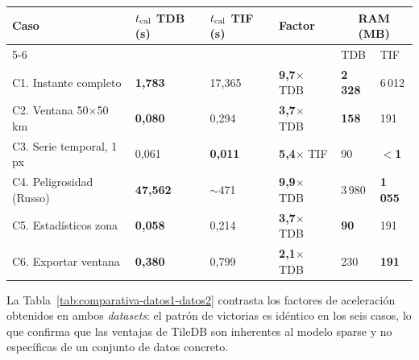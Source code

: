 \begin{center}
\begin{tabularx}{\textwidth}{p{4.5cm}XXXXX}
\toprule
\textbf{Caso}
  & \textbf{$t_{\rm cal}$ TDB (s)}
  & \textbf{$t_{\rm cal}$ TIF (s)}
  & \textbf{Factor}
  & \multicolumn{2}{c}{\textbf{RAM (MB)}} \\
\cmidrule(lr){5-6}
  & & & & TDB & TIF \\
\midrule
C1. Instante completo   & \textbf{1,783}  & 17,365         & \textbf{9,7}$\times$ TDB  & \textbf{2\,328} & 6\,012 \\
C2. Ventana 50$\times$50 km & \textbf{0,080} & 0,294       & \textbf{3,7}$\times$ TDB  & \textbf{158}    & 191 \\
C3. Serie temporal, 1 px & 0,061          & \textbf{0,011} & \textbf{5,4}$\times$ TIF  & 90              & \textbf{$<$1} \\
C4. Peligrosidad (Russo)       & \textbf{47,562} & $\sim$471      & \textbf{9,9}$\times$ TDB  & 3\,980          & \textbf{1\,055} \\
C5. Estadísticos zona   & \textbf{0,058}  & 0,214          & \textbf{3,7}$\times$ TDB  & \textbf{90}     & 191 \\
C6. Exportar ventana    & \textbf{0,380}  & 0,799          & \textbf{2,1}$\times$ TDB  & 230             & \textbf{191} \\
\bottomrule
\end{tabularx}
\captionsetup{hypcap=false}
\label{tab:bench-datos2}
\end{center}

\clearpage
La Tabla~\ref{tab:comparativa-datos1-datos2} contrasta los factores de aceleración obtenidos en ambos \textit{datasets}: el patrón de victorias es idéntico en los seis casos, lo que confirma que las ventajas de TileDB son inherentes al modelo sparse y no específicas de un conjunto de datos concreto.


